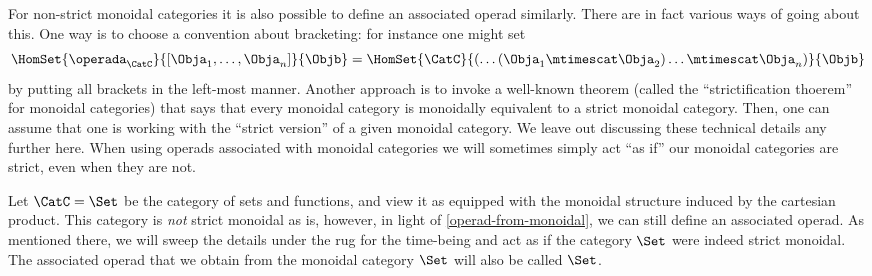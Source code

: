
\begin{remark}\label{operad-from-monoidal}
For non-strict monoidal categories it is also possible to define an associated operad similarly. There are in fact various ways of going about this. One way is to choose a convention about bracketing: for instance one might set
$$\HomSet{\operada_\CatC}{[\Obja_1,\ldots,\Obja_n]}{\Objb}=\HomSet{\CatC}{ ( \dots (\Obja_1 \mtimescat \Obja_2) \ldots \mtimescat \Obja_n)}{\Objb}$$
by putting all brackets in the left-most manner.
Another approach is to invoke a well-known theorem (called the ``strictification thoerem'' for monoidal categories) that says that every monoidal category is monoidally equivalent to a strict monoidal category. Then, one can assume that one is working with the ``strict version'' of a given monoidal category. We leave out discussing these technical details any further here. When using operads associated with monoidal categories we will sometimes simply act ``as if'' our monoidal categories are strict, even when they are not.
\end{remark}

\begin{example}
Let $\CatC = \Set$ be the category of sets and functions, and view it as equipped with the monoidal structure induced by the cartesian product. This category is \emph{not} strict monoidal as is, however, in light of \cref{operad-from-monoidal}, we can still define an associated operad. As mentioned there, we will sweep the details under the rug for the time-being and act as if the category $\Set$ were indeed strict monoidal. The associated operad that we obtain from the monoidal category $\Set$ will also be called $\Set$.
\end{example}

